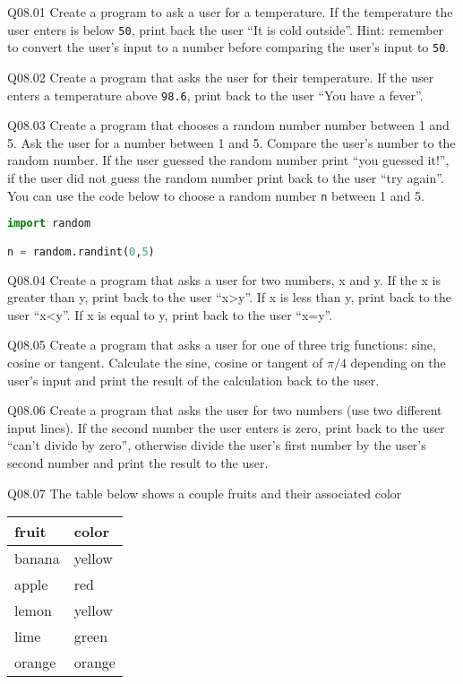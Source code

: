 \documentclass{book}
\newenvironment{problems}{}{}  %
\newcommand{\passthrough}[1]{#1}
\begin{document}
    
        \begin{problems}
        Q08.01 Create a program to ask a user for a temperature. If the
temperature the user enters is below \passthrough{\lstinline!50!}, print
back the user ``It is cold outside''. Hint: remember to convert the
user's input to a number before comparing the user's input to
\passthrough{\lstinline!50!}.

Q08.02 Create a program that asks the user for their temperature. If the
user enters a temperature above \passthrough{\lstinline!98.6!}, print
back to the user ``You have a fever''.

Q08.03 Create a program that chooses a random number number between 1
and 5. Ask the user for a number between 1 and 5. Compare the user's
number to the random number. If the user guessed the random number print
``you guessed it!'', if the user did not guess the random number print
back to the user ``try again''. You can use the code below to choose a
random number \passthrough{\lstinline!n!} between 1 and 5.

\begin{lstlisting}[language=Python]
import random

n = random.randint(0,5)
\end{lstlisting}

Q08.04 Create a program that asks a user for two numbers, x and y. If
the x is greater than y, print back to the user ``x\textgreater{}y''. If
x is less than y, print back to the user ``x\textless{}y''. If x is
equal to y, print back to the user ``x=y''.

Q08.05 Create a program that asks a user for one of three trig
functions: sine, cosine or tangent. Calculate the sine, cosine or
tangent of \(\pi/4\) depending on the user's input and print the result
of the calculation back to the user.

Q08.06 Create a program that asks the user for two numbers (use two
different input lines). If the second number the user enters is zero,
print back to the user ``can't divide by zero'', otherwise divide the
user's first number by the user's second number and print the result to
the user.

Q08.07 The table below shows a couple fruits and their associated color

\begin{longtable}[]{@{}ll@{}}
\toprule
fruit & color\tabularnewline
\midrule
\endhead
banana & yellow\tabularnewline
apple & red\tabularnewline
lemon & yellow\tabularnewline
lime & green\tabularnewline
orange & orange\tabularnewline
\bottomrule
\end{longtable}


\end{problems}
\end{document}
